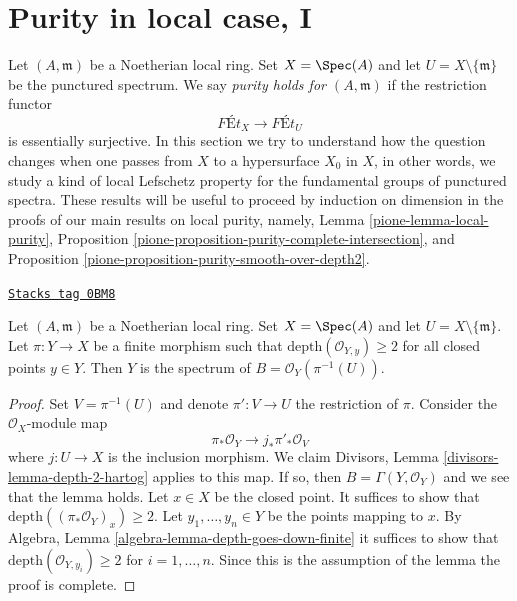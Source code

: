\section{Purity in local case, I}
\label{pione-section-local-purity}
Let $(A, \mathfrak m)$ be a Noetherian local ring. Set $X = \Spec(A)$
and let $U = X \setminus \{\mathfrak m\}$ be the punctured spectrum.
We say {\it purity holds for $(A, \mathfrak m)$} if the restriction functor
$$
\textit{F\'Et}_X \longrightarrow \textit{F\'Et}_U
$$
is essentially surjective. In this section we try to understand how the
question changes when one passes from $X$ to a hypersurface $X_0$ in $X$,
in other words, we study a kind of local Lefschetz property for the
fundamental groups of punctured spectra.
These results will be useful to proceed by induction on dimension
in the proofs of our main results on local purity, namely,
Lemma \ref{pione-lemma-local-purity},
Proposition \ref{pione-proposition-purity-complete-intersection}, and
Proposition \ref{pione-proposition-purity-smooth-over-depth2}.

\begin{lemma}
\label{pione-lemma-sections-over-punctured-spec}
\href{https://stacks.math.columbia.edu/tag/0BM8}{\texttt{Stacks tag 0BM8}}

Let $(A, \mathfrak m)$ be a Noetherian local ring. Set $X = \Spec(A)$
and let $U = X \setminus \{\mathfrak m\}$.
Let $\pi : Y \to X$ be a finite morphism such that
$\text{depth}(\mathcal{O}_{Y, y}) \geq 2$ for all closed points
$y \in Y$.
Then $Y$ is the spectrum of $B = \mathcal{O}_Y(\pi^{-1}(U))$.
\end{lemma}

\begin{proof}
Set $V = \pi^{-1}(U)$ and denote $\pi' : V \to U$ the restriction of $\pi$.
Consider the $\mathcal{O}_X$-module map
$$
\pi_*\mathcal{O}_Y \longrightarrow j_*\pi'_*\mathcal{O}_V
$$
where $j : U \to X$ is the inclusion morphism. We claim
Divisors, Lemma \ref{divisors-lemma-depth-2-hartog}
applies to this map. If so, then $B = \Gamma(Y, \mathcal{O}_Y)$
and we see that the lemma holds. Let $x \in X$ be the closed point.
It suffices to show that
$\text{depth}((\pi_*\mathcal{O}_Y)_x) \geq 2$.
Let $y_1, \ldots, y_n \in Y$ be the points mapping to $x$.
By Algebra, Lemma \ref{algebra-lemma-depth-goes-down-finite}
it suffices to show that
$\text{depth}(\mathcal{O}_{Y, y_i}) \geq 2$ for $i = 1, \ldots, n$.
Since this is the assumption of the lemma the proof is complete.
\end{proof}

